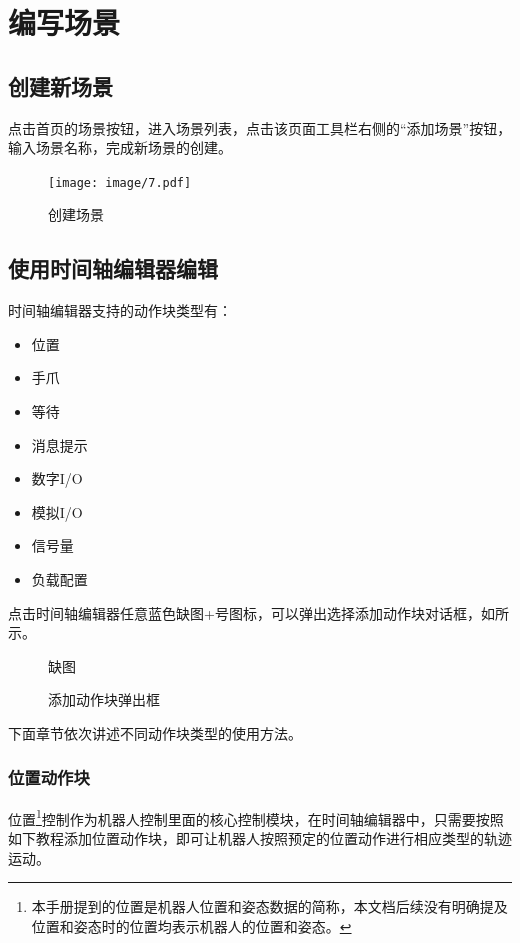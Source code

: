 
\section{编写场景}
\subsection{创建新场景}
点击\LM 首页的场景按钮，进入场景列表，点击该页面工具栏右侧的“添加场景”按钮，输入场景名称，完成新场景的创建。

\begin{figure}[ht]
	\centering
	\texttt{[image: image/7.pdf]}
	\caption{创建场景}
	\label{fig:创建场景}
\end{figure}

\subsection{使用时间轴编辑器编辑}
时间轴编辑器支持的动作块类型有：
\begin{itemize}
\item 位置
\item 手爪
\item 等待
\item 消息提示
\item 数字I/O
\item 模拟I/O
\item 信号量
\item 负载配置
\end{itemize}

点击时间轴编辑器任意蓝色{\color{red}缺图+}号图标，可以弹出选择添加动作块对话框，如所示。

\begin{figure}[ht]
	\centering
	\color{red}缺图
	\caption{添加动作块弹出框}
	\label{fig:添加动作块弹出框}
\end{figure}

下面章节依次讲述不同动作块类型的使用方法。
\subsubsection{位置动作块}
位置\footnote{本手册提到的位置是机器人位置和姿态数据的简称，本文档后续没有明确提及位置和姿态时的位置均表示机器人的位置和姿态。}控制作为机器人控制里面的核心控制模块，在时间轴编辑器中，只需要按照如下教程添加位置动作块，即可让机器人按照预定的位置动作进行相应类型的轨迹运动。
